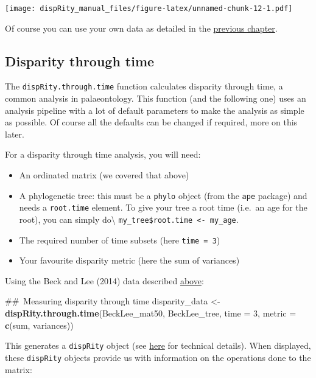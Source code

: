 \documentclass[]{book}
\newenvironment{Shaded}{\begin{snugshade}}{\end{snugshade}}
\newcommand{\KeywordTok}[1]{\textcolor[rgb]{0.13,0.29,0.53}{\textbf{#1}}}
\newcommand{\DataTypeTok}[1]{\textcolor[rgb]{0.13,0.29,0.53}{#1}}
\newcommand{\DecValTok}[1]{\textcolor[rgb]{0.00,0.00,0.81}{#1}}
\newcommand{\StringTok}[1]{\textcolor[rgb]{0.31,0.60,0.02}{#1}}
\newcommand{\NormalTok}[1]{#1}
\providecommand{\tightlist}{%
  \setlength{\itemsep}{0pt}\setlength{\parskip}{0pt}}
\theoremstyle{definition}
\theoremstyle{definition}
\theoremstyle{remark}
\begin{document}
\texttt{[image: dispRity\_manual\_files/figure-latex/unnamed-chunk-12-1.pdf]}

Of course you can use your own data as detailed in the
\protect\hyperlink{What-sort-of-data-does-dispRity-work-with}{previous
chapter}.

\subsection{Disparity through time}\label{disparity-through-time}

The \texttt{dispRity.through.time} function calculates disparity through
time, a common analysis in palaeontology. This function (and the
following one) uses an analysis pipeline with a lot of default
parameters to make the analysis as simple as possible. Of course all the
defaults can be changed if required, more on this later.

For a disparity through time analysis, you will need:

\begin{itemize}
\tightlist
\item
  An ordinated matrix (we covered that above)
\item
  A phylogenetic tree: this must be a \texttt{phylo} object (from the
  \texttt{ape} package) and needs a \texttt{root.time} element. To give
  your tree a root time (i.e.~an age for the root), you can simply
  do\textbackslash{}
  \texttt{my\_tree\$root.time\ \textless{}-\ my\_age}.
\item
  The required number of time subsets (here \texttt{time\ =\ 3})
\item
  Your favourite disparity metric (here the sum of variances)
\end{itemize}

Using the Beck and Lee (2014) data described
\protect\hyperlink{example-data}{above}:

\begin{Shaded}
\begin{Highlighting}[]
\NormalTok{## Measuring disparity through time}
\NormalTok{disparity_data <-}\StringTok{ }\KeywordTok{dispRity.through.time}\NormalTok{(BeckLee_mat50, BeckLee_tree,}
                                        \DataTypeTok{time =} \DecValTok{3}\NormalTok{, }\DataTypeTok{metric =} \KeywordTok{c}\NormalTok{(sum, variances))}
\end{Highlighting}
\end{Shaded}

This generates a \texttt{dispRity} object (see
\protect\hyperlink{guts}{here} for technical details). When displayed,
these \texttt{dispRity} objects provide us with information on the
operations done to the matrix:
\end{document}
